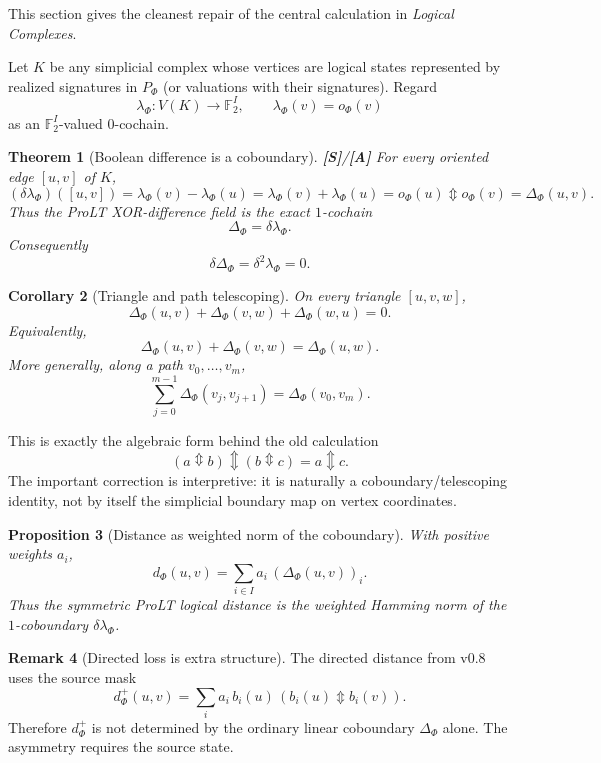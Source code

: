 \documentclass[11pt]{article}
\newtheorem{theorem}{Theorem}[section]
\newtheorem{proposition}[theorem]{Proposition}
\newtheorem{corollary}[theorem]{Corollary}
\theoremstyle{definition}
\newtheorem{remark}[theorem]{Remark}
\newcommand{\F}{\mathbb F_2}
\newcommand{\xor}{\mathbin{\Updownarrow}}
\newcommand{\statusS}{\textbf{[S]}}
\newcommand{\statusA}{\textbf{[A]}}
\begin{document}
This section gives the cleanest repair of the central calculation in \emph{Logical Complexes}.

Let $K$ be any simplicial complex whose vertices are logical states represented by realized signatures in $P_\Phi$ (or valuations with their signatures). Regard
\[
\lambda_\Phi:V(K)\longrightarrow\F^{I},\qquad
\lambda_\Phi(v)=o_\Phi(v)
\]
as an $\F^I$-valued $0$-cochain.

\begin{theorem}[Boolean difference is a coboundary]\label{thm:coboundary}
\statusS/\statusA\;
For every oriented edge $[u,v]$ of $K$,
\[
(\delta\lambda_\Phi)([u,v])
=\lambda_\Phi(v)-\lambda_\Phi(u)
=\lambda_\Phi(v)+\lambda_\Phi(u)
=o_\Phi(u)\xor o_\Phi(v)
=\Delta_\Phi(u,v).
\]
Thus the ProLT XOR-difference field is the exact $1$-cochain
\[
\Delta_\Phi=\delta\lambda_\Phi.
\]
Consequently
\[
\delta\Delta_\Phi=\delta^2\lambda_\Phi=0.
\]
\end{theorem}

\begin{corollary}[Triangle and path telescoping]
On every triangle $[u,v,w]$,
\[
\Delta_\Phi(u,v)+\Delta_\Phi(v,w)+\Delta_\Phi(w,u)=0.
\]
Equivalently,
\[
\Delta_\Phi(u,v)+\Delta_\Phi(v,w)=\Delta_\Phi(u,w).
\]
More generally, along a path $v_0,\ldots,v_m$,
\[
\sum_{j=0}^{m-1}\Delta_\Phi(v_j,v_{j+1})
=\Delta_\Phi(v_0,v_m).
\]
\end{corollary}

This is exactly the algebraic form behind the old calculation
\[
(a\xor b)\xor(b\xor c)=a\xor c.
\]
The important correction is interpretive: it is naturally a coboundary/telescoping identity, not by itself the simplicial boundary map on vertex coordinates.

\begin{proposition}[Distance as weighted norm of the coboundary]
With positive weights $a_i$,
\[
d_\Phi(u,v)=\sum_{i\in I}a_i\,(\Delta_\Phi(u,v))_i.
\]
Thus the symmetric ProLT logical distance is the weighted Hamming norm of the $1$-coboundary $\delta\lambda_\Phi$.
\end{proposition}

\begin{remark}[Directed loss is extra structure]
The directed distance from v0.8 uses the source mask
\[
d_\Phi^+(u,v)=\sum_i a_i\,b_i(u)\,(b_i(u)\xor b_i(v)).
\]
Therefore $d_\Phi^+$ is not determined by the ordinary linear coboundary $\Delta_\Phi$ alone. The asymmetry requires the source state.
\end{remark}
\end{document}
